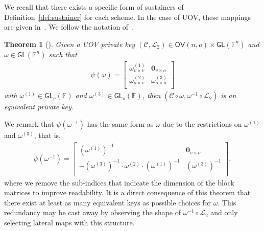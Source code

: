 \documentclass[english]{ufsc-thesis-rn46-2019/ufsc-thesis-rn46-2019}
\newtheorem{theorem}{Theorem}[section]
\theoremstyle{definition}
\begin{document}
We recall that there exists a specific form of sustainers of
Definition~\ref{def:sustainer} for each scheme. In the case of UOV, these
mappings are given in~\cite[Sec.~4.3]{Wolf:201104}. We follow the notation
of~\cite{Petzoldt:201307}.

\begin{theorem}[{\cite[Thm.~4.15]{Wolf:201104}}]\label{thm:eq-keys-uov}
  Given a UOV private key
  $(\mathcal{C}, \mathcal{L}_{2}) \in \mathsf{OV}(n, o)
    \times \mathsf{GL}(\mathbb{F}^{n})$
  and $\omega \in \mathsf{GL}(\mathbb{F}^{n})$ such that
  \begin{align}
    \psi(\omega) =
    \begin{bmatrix}
      \omega_{v \times v}^{(1)} & \mathbf{0}_{v \times o}   \\
      \omega_{o \times v}^{(2)} & \omega_{o \times o}^{(3)} \\
    \end{bmatrix}
  \end{align}
  with $\omega^{(1)} \in \mathsf{GL}_{v}(\mathbb{F})$ and
  $\omega^{(3)} \in \mathsf{GL}_{o}(\mathbb{F})$, then
  $(\mathcal{C} \circ \omega, \omega^{-1} \circ \mathcal{L}_{2})$ is an
  equivalent private key.
\end{theorem}

We remark that $\psi(\omega^{-1})$ has the same form as $\omega$ due to the
restrictions on $\omega^{(1)}$ and $\omega^{(3)}$, that is,
\begin{align}
  \psi(\omega^{-1}) =
  \begin{bmatrix}
    {(\omega^{(1)})}^{-1}
      & \mathbf{0}_{v \times o} \\
    {-(\omega^{(3)})}^{-1} \cdot \omega^{(2)} \cdot {(\omega^{(1)})}^{-1}
      & {(\omega^{(3)})}^{-1} \\
  \end{bmatrix},
\end{align}
where we remove the sub-indices that indicate the dimension of the block
matrices to improve readability. It is a direct consequence of this theorem
that there exist at least as many equivalent keys as possible choices for
$\omega$. This redundancy may be cast away by observing the shape of
$\omega^{-1} \circ \mathcal{L}_{2}$ and only selecting lateral maps with this
structure.
\end{document}
